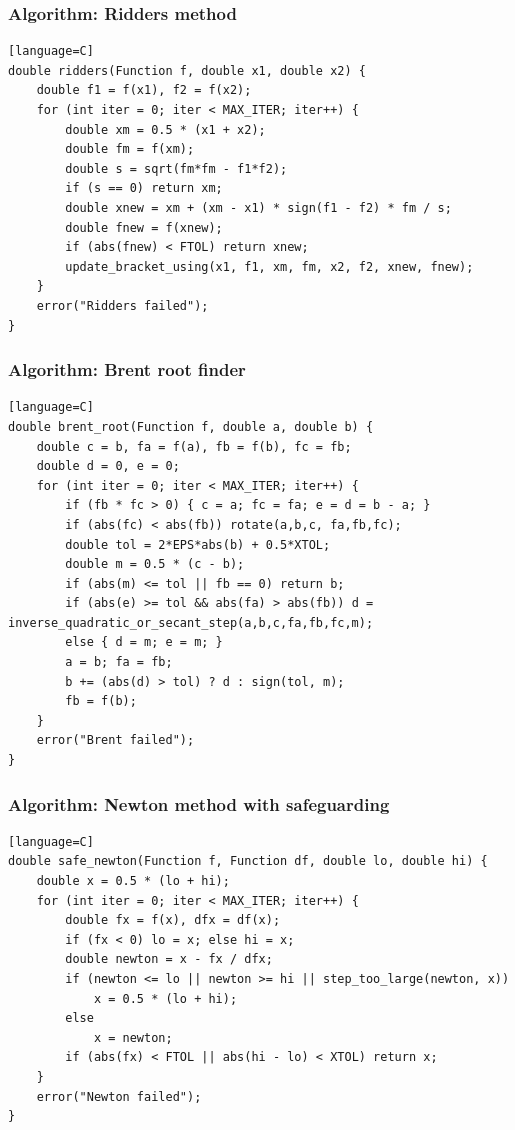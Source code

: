 \documentclass[11pt]{article}
\begin{document}
\subsubsection{Algorithm: Ridders method}\label{algorithm-ridders-method}

\begin{verbatim}[language=C]
double ridders(Function f, double x1, double x2) {
    double f1 = f(x1), f2 = f(x2);
    for (int iter = 0; iter < MAX_ITER; iter++) {
        double xm = 0.5 * (x1 + x2);
        double fm = f(xm);
        double s = sqrt(fm*fm - f1*f2);
        if (s == 0) return xm;
        double xnew = xm + (xm - x1) * sign(f1 - f2) * fm / s;
        double fnew = f(xnew);
        if (abs(fnew) < FTOL) return xnew;
        update_bracket_using(x1, f1, xm, fm, x2, f2, xnew, fnew);
    }
    error("Ridders failed");
}
\end{verbatim}

\subsubsection{Algorithm: Brent root finder}\label{algorithm-brent-root-finder}

\begin{verbatim}[language=C]
double brent_root(Function f, double a, double b) {
    double c = b, fa = f(a), fb = f(b), fc = fb;
    double d = 0, e = 0;
    for (int iter = 0; iter < MAX_ITER; iter++) {
        if (fb * fc > 0) { c = a; fc = fa; e = d = b - a; }
        if (abs(fc) < abs(fb)) rotate(a,b,c, fa,fb,fc);
        double tol = 2*EPS*abs(b) + 0.5*XTOL;
        double m = 0.5 * (c - b);
        if (abs(m) <= tol || fb == 0) return b;
        if (abs(e) >= tol && abs(fa) > abs(fb)) d = inverse_quadratic_or_secant_step(a,b,c,fa,fb,fc,m);
        else { d = m; e = m; }
        a = b; fa = fb;
        b += (abs(d) > tol) ? d : sign(tol, m);
        fb = f(b);
    }
    error("Brent failed");
}
\end{verbatim}

\subsubsection{Algorithm: Newton method with safeguarding}\label{algorithm-newton-method-with-safeguarding}

\begin{verbatim}[language=C]
double safe_newton(Function f, Function df, double lo, double hi) {
    double x = 0.5 * (lo + hi);
    for (int iter = 0; iter < MAX_ITER; iter++) {
        double fx = f(x), dfx = df(x);
        if (fx < 0) lo = x; else hi = x;
        double newton = x - fx / dfx;
        if (newton <= lo || newton >= hi || step_too_large(newton, x))
            x = 0.5 * (lo + hi);
        else
            x = newton;
        if (abs(fx) < FTOL || abs(hi - lo) < XTOL) return x;
    }
    error("Newton failed");
}
\end{verbatim}
\end{document}
